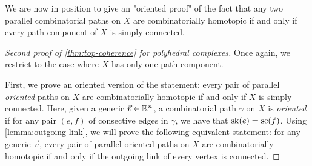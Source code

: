 We are now in position to give an "oriented proof" of the fact that any two parallel combinatorial paths on $X$ are combinatorially homotopic if and only if every path component of $X$ is simply connected.

\begin{proof}[Second proof of {\cref{thm:top-coherence}} for polyhedral complexes]
    Once again, we restrict to the case where $X$ has only one path component. 

    First, we prove an oriented version of the statement: every pair of parallel \emph{oriented} paths on $X$ are combinatorially homotopic if and only if $X$ is simply connected.
    Here, given a generic $\vec v \in \mathbb R^n$, a combinatorial path $\gamma$ on $X$ is \emph{oriented} if for any pair $(e, f)$ of consective edges in $\gamma$, we have that $\mathrm{sk}(e)=\mathrm{sc}(f)$.  
    Using \cref{lemma:outgoing-link}, we will prove the following equivalent statement: for any generic $\vec v$, every pair of parallel oriented paths on $X$ are combinatorially homotopic if and only if the outgoing link of every vertex is connected.


\end{proof}
